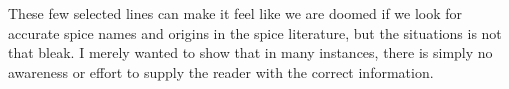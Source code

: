   





\noindent These few selected lines can make it feel like we are doomed if we look for accurate spice names and origins in the spice literature, but the situations is not that bleak. I merely wanted to show that in many instances, there is simply no awareness or effort to supply the reader with the correct information.

